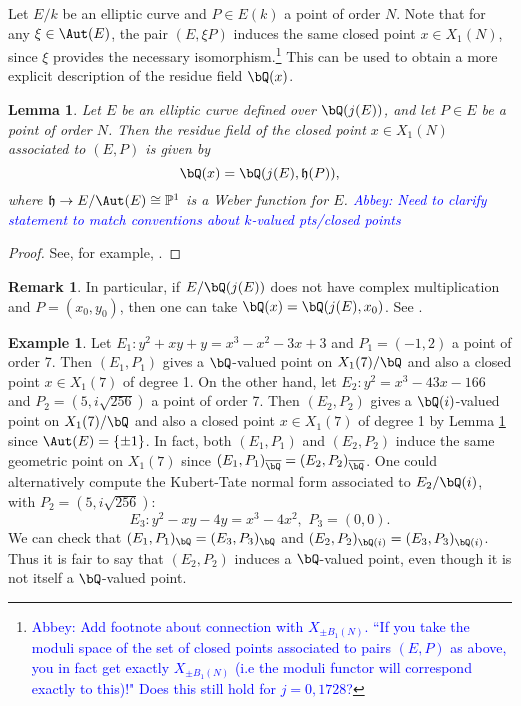 \documentclass[11pt,reqno]{amsart}
\theoremstyle{plain}
\newtheorem{lemma}[theorem]{Lemma}
\theoremstyle{definition}
\newtheorem{remark}[theorem]{Remark}
\newtheorem{example}[theorem]{Example}
\newcommand{\Q}{\bQ}
\newcommand{\abbey}[1]{\textcolor{blue}{Abbey: #1}}
\newcommand{\abedit}[1]{{\color{blue} #1}}
\begin{document}
Let $E/k$ be an elliptic curve and $P \in E(k)$ a point of order $N$. Note that for any $\xi \in \Aut(E)$, the pair $(E,\xi P)$ induces the same closed point $x \in X_1(N)$, since $\xi$ provides the necessary isomorphism.\footnote{ \abbey{Add footnote about connection with $X_{\pm B_1(N)}$. ``If you take the moduli space of the set of closed points associated to pairs $(E,P)$ as above, you in fact get exactly $X_{\pm B_1(N)}$ (i.e the moduli functor will correspond exactly to this)!" Does this still hold for $j=0,1728$?}} This can be used to obtain a more explicit description of the residue field $\Q(x)$.

\begin{lemma}\label{ResidueFieldLemma}
Let $E$ be an elliptic curve defined over $\Q(j(E))$, and let $P \in E$ be a point of order $N$. Then the residue field of the closed point $x \in X_1(N)$ associated to $(E,P)$ is given by
\[
\Q(x)=\Q(j(E),\mathfrak{h}(P)),
\]
where $\mathfrak{h} \rightarrow E/\Aut(E) \cong \mathbb{P}^1$ is a Weber function for $E$. \abbey{Need to clarify statement to match conventions about $k$-valued pts/closed points}
\end{lemma}

\begin{proof}
See, for example, \cite[Lemma 2.5]{OddDegQCurve}. 
\end{proof}

\begin{remark} In particular, if $E/\Q(j(E))$ does not have complex multiplication and $P=(x_0,y_0)$, then one can take $\Q(x)=\Q(j(E),x_0)$. See \cite[p. 107]{shimura}.
\end{remark}
\begin{example}
Let $E_1:y^2+xy+y=x^3-x^2-3x+3$ and $P_1=(-1,2)$ a point of order 7. Then $(E_1,P_1)$ gives a $\Q$-valued point on $X_1(7)/\Q$ and also a closed point $x\in X_1(7)$ of degree 1. On the other hand, let $E_2:y^2=x^3-43x-166$ and $P_2=(5,i\sqrt{256})$ a point of order 7. Then $(E_2,P_2)$ gives a $\Q(i)$-valued point on $X_1(7)/\Q$ and also a closed point $x\in X_1(7)$ of degree 1 by Lemma \ref{ResidueFieldLemma} \abedit{since $\Aut(E) = \{\pm1\}$}. In fact, both $(E_1,P_1)$ and $(E_2,P_2)$ induce the same geometric point on $X_1(7)$ since $(E_1,P_1)_{\overline{\Q}}=(E_2,P_2)_{\overline{\Q}}$. One could alternatively compute the Kubert-Tate normal form associated to $E_2/\Q(i)$, with $P_2=(5,i\sqrt{256})$:
\[E_3: y^2-xy-4y=x^3-4x^2,\, \, P_3=(0,0).
\]
We can check that $(E_1,P_1)_{\Q}=(E_3,P_3)_{\Q}$ and $(E_2,P_2)_{\Q(i)} =(E_3,P_3)_{\Q(i)}$. Thus it is fair to say that $(E_2,P_2)$ induces a $\Q$-valued point, even though it is not itself a $\Q$-valued point. 
\end{example}
\end{document}
